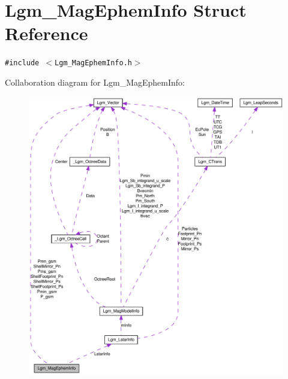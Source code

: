 \hypertarget{struct_lgm___mag_ephem_info}{
\section{Lgm\_\-MagEphemInfo Struct Reference}
\label{struct_lgm___mag_ephem_info}
}
{\tt \#include $<$Lgm\_\-MagEphemInfo.h$>$}

Collaboration diagram for Lgm\_\-MagEphemInfo:\nopagebreak
\begin{figure}[H]
\begin{center}
\leavevmode
\includegraphics[width=400pt]{struct_lgm___mag_ephem_info__coll__graph}
\end{center}
\end{figure}
